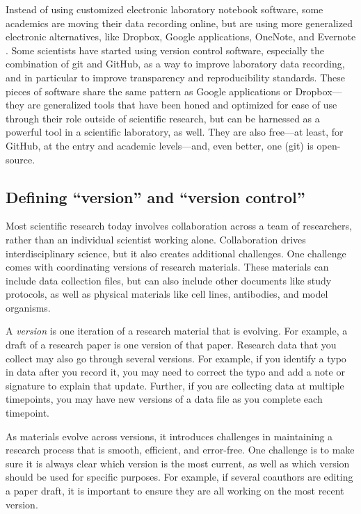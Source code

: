 \documentclass[]{tufte-book}
\begin{document}
Instead of using customized electronic laboratory notebook software, some
academics are moving their data recording online, but are using more generalized
electronic alternatives, like Dropbox, Google applications, OneNote, and
Evernote \citep{perkel2011coding, kwok2018lab, giles2012digital, powell2012lab}.
Some scientists have started using version control software, especially the
combination of git and GitHub, as a way to improve laboratory data recording,
and in particular to improve transparency and reproducibility standards.
These pieces of software share the same pattern as Google applications or
Dropbox---they are generalized tools that have been honed and optimized for ease
of use through their role outside of scientific research, but can be harnessed
as a powerful tool in a scientific laboratory, as well. They are also free---at
least, for GitHub, at the entry and academic levels---and, even better, one
(git) is open-source.

\subsection{Defining ``version'' and ``version control''}\label{defining-version-and-version-control}

Most scientific research today involves collaboration across a team of
researchers, rather than an individual scientist working alone. Collaboration
drives interdisciplinary science, but it also creates additional challenges. One
challenge comes with coordinating versions of research materials. These
materials can include data collection files, but can also include other
documents like study protocols, as well as physical materials like cell lines,
antibodies, and model organisms.

A \emph{version} is one iteration of a research material that is evolving. For
example, a draft of a research paper is one version of that paper. Research data
that you collect may also go through several versions. For example, if you
identify a typo in data after you record it, you may need to correct the typo
and add a note or signature to explain that update. Further, if you are
collecting data at multiple timepoints, you may have new versions of a data file
as you complete each timepoint.

As materials evolve across versions, it introduces challenges in maintaining a
research process that is smooth, efficient, and error-free. One challenge is to
make sure it is always clear which version is the most current, as well as which
version should be used for specific purposes. For example, if several coauthors
are editing a paper draft, it is important to ensure they are all working on the
most recent version.
\end{document}
